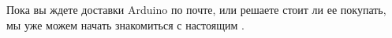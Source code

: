 \secdown

Пока вы ждете доставки Arduino по почте, или решаете стоит ли ее покупать, мы
уже можем начать знакомиться с настоящим .

\secup
